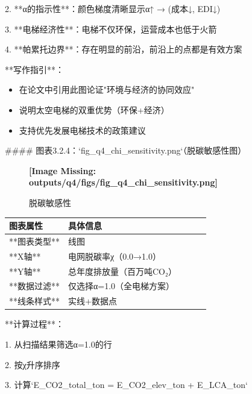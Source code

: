 \documentclass[a4paper,12pt]{article}
\begin{document}
\par
2. **α的指示性**：颜色梯度清晰显示α↑ → (成本↓, EDI↓)

\par
3. **电梯经济性**：电梯不仅环保，运营成本也低于火箭

\par
4. **帕累托边界**：存在明显的前沿，前沿上的点都是有效方案

\par
**写作指引**：

\par
\begin{itemize}
\item 在论文中引用此图论证"环境与经济的协同效应"
\end{itemize}
\begin{itemize}
\item 说明太空电梯的双重优势（环保+经济）
\end{itemize}
\begin{itemize}
\item 支持优先发展电梯技术的政策建议
\end{itemize}
#### 图表3.2.4：`fig\_q4\_chi\_sensitivity.png`（脱碳敏感性图）

\par
\begin{figure}[h!]
\centering
\textbf{[Image Missing: outputs/q4/figs/fig_q4_chi_sensitivity.png]}
\caption{脱碳敏感性}
\end{figure}
\begin{center}
\begin{longtable}{|l|l|l|l|l|}
\hline
图表属性 & 具体信息 \\ \hline
**图表类型** & 线图 \\ \hline
**X轴** & 电网脱碳率χ（0.0→1.0） \\ \hline
**Y轴** & 总年度排放量（百万吨CO₂） \\ \hline
**数据过滤** & 仅选择α=1.0（全电梯方案） \\ \hline
**线条样式** & 实线+数据点 \\ \hline
\end{longtable}
\end{center}
**计算过程**：

\par
1. 从扫描结果筛选α=1.0的行

\par
2. 按χ升序排序

\par
3. 计算`E\_CO2\_total\_ton = E\_CO2\_elev\_ton + E\_LCA\_ton`
\end{document}

